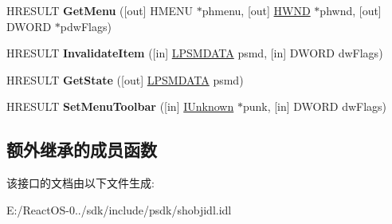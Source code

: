 \begin{DoxyCompactItemize}
H\+R\+E\+S\+U\+LT {\bfseries Get\+Menu} (\mbox{[}out\mbox{]} H\+M\+E\+NU $\ast$phmenu, \mbox{[}out\mbox{]} \hyperlink{interfacevoid}{H\+W\+ND} $\ast$phwnd, \mbox{[}out\mbox{]} D\+W\+O\+RD $\ast$pdw\+Flags)
\item 
\mbox{\label{interface_i_shell_menu_a56ba1f7a05b8aa97d0821f55a623f164}} 
H\+R\+E\+S\+U\+LT {\bfseries Invalidate\+Item} (\mbox{[}in\mbox{]} \hyperlink{structtag_s_m_d_a_t_a}{L\+P\+S\+M\+D\+A\+TA} psmd, \mbox{[}in\mbox{]} D\+W\+O\+RD dw\+Flags)
\item 
\mbox{\label{interface_i_shell_menu_a1f678452654ba6f2a792a616f82c4422}} 
H\+R\+E\+S\+U\+LT {\bfseries Get\+State} (\mbox{[}out\mbox{]} \hyperlink{structtag_s_m_d_a_t_a}{L\+P\+S\+M\+D\+A\+TA} psmd)
\item 
\mbox{\label{interface_i_shell_menu_adba3dc0bbfded689e914e306a900b3e4}} 
H\+R\+E\+S\+U\+LT {\bfseries Set\+Menu\+Toolbar} (\mbox{[}in\mbox{]} \hyperlink{interface_i_unknown}{I\+Unknown} $\ast$punk, \mbox{[}in\mbox{]} D\+W\+O\+RD dw\+Flags)
\end{DoxyCompactItemize}
\subsection*{额外继承的成员函数}


该接口的文档由以下文件生成\+:\begin{DoxyCompactItemize}
\item 
E\+:/\+React\+O\+S-\/0../sdk/include/psdk/shobjidl.\+idl\end{DoxyCompactItemize}
